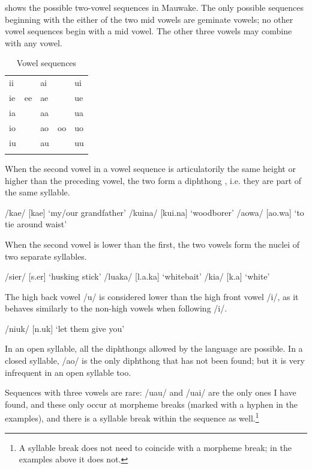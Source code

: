  shows the possible two-vowel sequences in Mauwake. The only possible sequences beginning with the either of the two mid vowels are geminate vowels; no other vowel sequences begin with a mid vowel. The other three vowels may combine with any vowel.


\begin{table}
\caption{Vowel sequences}
\label{tab:6:vowelseq}
\begin{tabular}{lllll}
\mytoprule 
ii &  & ai &  & ui\\
ie & ee & ae &  & ue\\
ia &  & aa &  & ua\\
io &  & ao & oo & uo\\
iu &  & au &  & uu\\
\mybottomrule
\end{tabular}
\end{table}

When the second vowel in a vowel sequence is articulatorily the same height or higher than the preceding vowel, the two form a diphthong , i.e. they are part of the same syllable.

\ea
\ea
/kae/  [{{\textprimstress}kae}]  `my/our grandfather'
\ex
/kuina/  [{{\textprimstress}kui.na}]  `woodborer'
\ex
/aowa/  [{{\textprimstress}ao.wa}]  `to tie around waist'
\z
\z


When the second vowel is lower than the first, the two vowels form the nuclei of two separate syllables. 

\ea
\ea
/sier/  [s{\textsci}.{{\textprimstress}er}]  `husking stick'
\ex
/luaka/  [l{\textupsilon}.{{\textprimstress}a.ka}]  `whitebait'
\ex
/kia/  [k{\textsci}.{{\textprimstress}a}]  `white'
\z
\z


The high back vowel /u/ is considered lower than the high front vowel /i/, as it behaves similarly to the non-high vowels when following /i/.

\ea
/niuk/  [n{\textsci}.{{\textprimstress}uk}]  `let them give you'
\z

In an open syllable, all the diphthongs allowed by the language are possible. In a closed syllable, /ao/ is the only diphthong that has not been found; but it is very infrequent in an open syllable too. 

Sequences with three vowels are rare: /uau/ and /uai/ are the only ones I have found, and these only occur at morpheme breaks (marked with a hyphen in the examples), and there is a syllable break within the sequence as well.\footnote{A syllable break does not need to coincide with a morpheme break; in the examples above it does not.}  

